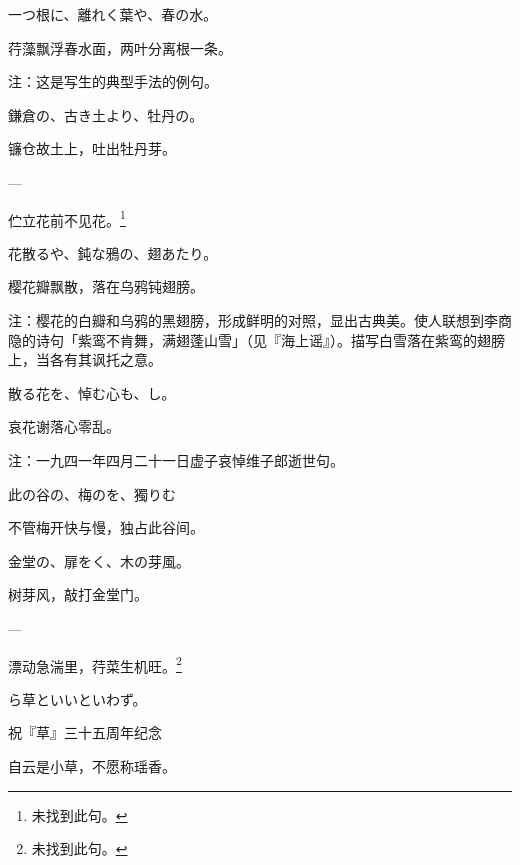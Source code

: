 \begin{haiku}
    {\FH 一つ根に、離れく葉や、春の水。}

    {\FK 荇藻飘浮春水面，两叶分离根一条。}

    {\FT 注：这是写生的典型手法的例句。}
\end{haiku}

\begin{haiku}
    {\FH 鎌倉の、古き土より、牡丹の。}

    {\FK 镰仓故土上，吐出牡丹芽。}
\end{haiku}

\begin{haiku}
    {\FH ---}

    {\FK 伫立花前不见花。\footnote{\FT 未找到此句。}}
\end{haiku}

\begin{haiku}
    {\FH 花散るや、鈍な鴉の、翅あたり。}

    {\FK 樱花瓣飘散，落在乌鸦钝翅膀。}

    {\FT 注：樱花的白瓣和乌鸦的黑翅膀，形成鲜明的对照，显出古典美。使人联想到李商隐的诗句「紫鸾不肯舞，满翅蓬山雪」（见『海上谣』）。描写白雪落在紫鸾的翅膀上，当各有其讽托之意。}
\end{haiku}

\begin{haiku}
    {\FH 散る花を、悼む心も、し。}

    {\FK 哀花谢落心零乱。}

    {\FT 注：一九四一年四月二十一日虚子哀悼维子郎逝世句。}
\end{haiku}

\begin{haiku}
    {\FH 此の谷の、梅のを、獨りむ}

    {\FK 不管梅开快与慢，独占此谷间。}
\end{haiku}

\begin{haiku}
    {\FH 金堂の、扉をく、木の芽風。}

    {\FK 树芽风，敲打金堂门。}
\end{haiku}

\begin{haiku}
    {\FH ---}

    {\FK 漂动急湍里，荇菜生机旺。\footnote{\FT 未找到此句。}}
\end{haiku}

\begin{haiku}
    {\FH {}ら草といいといわず。}

    {\FK 祝『草』三十五周年纪念}

    {\FK 自云是小草，不愿称瑶香。}
\end{haiku}

